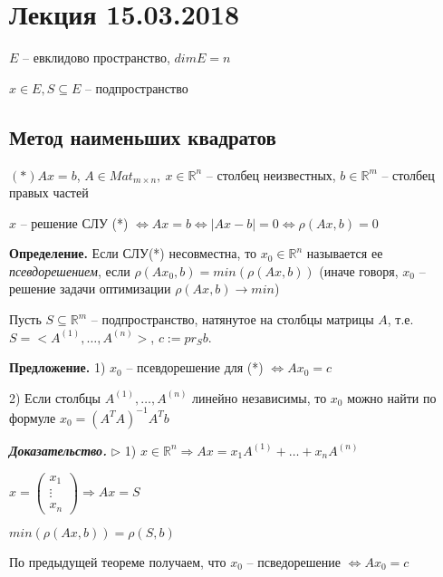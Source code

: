 \section{Лекция 15.03.2018}

$E$ -- евклидово пространство, $dimE = n$

$x \in E, S \subseteq E$ -- подпространство

\vspace{\baselineskip}
\subsection{Метод наименьших квадратов}

$(*) Ax = b$, $A \in Mat_{m \times n}, \ x \in \mathbb{R}^n$ -- столбец неизвестных, $b \in \mathbb{R}^m$ -- столбец правых частей

$x$ -- решение СЛУ (*) $\Leftrightarrow Ax = b \Leftrightarrow |Ax - b| = 0 \Leftrightarrow \rho (Ax, b) = 0$

\vspace{\baselineskip}
\textbf{Определение.} Если СЛУ(*) несовместна, то $x_0 \in \mathbb{R}^n$ называется ее \textit{псевдорешением}, если $\rho(Ax_0, b) = min (\rho(Ax, b))$ (иначе говоря, $x_0$ -- решение задачи оптимизации $\rho(Ax, b) \rightarrow min$)

\vspace{\baselineskip}
Пусть $S \subseteq \mathbb{R}^m$ -- подпространство, натянутое на столбцы матрицы $A$, т.е. $S = <A^{(1)}, \dots, A^{(n)}>$, $c := pr_S b$.

\vspace{\baselineskip}
\textbf{Предложение.} 1) $x_0$ -- псевдорешение для (*) $\Leftrightarrow Ax_0 = c$

2) Если столбцы $A^{(1)}, \dots, A^{(n)}$ линейно независимы, то $x_0$ можно найти по формуле $x_0 = (A^T A)^{-1} A^T b$

\vspace{\baselineskip}
\textbf{\textit{Доказательство.}} $\rhd$ 1) $x \in \mathbb{R}^n \Rightarrow Ax = x_1 A^{(1)} + \dots + x_n A^{(n)}$

$x = \begin{pmatrix} x_1 \\ \vdots \\ x_n \end{pmatrix} \Rightarrow Ax = S$

$min( \rho (Ax, b)) = \rho (S, b)$

\vspace{\baselineskip}
По предыдущей теореме получаем, что $x_0$ -- псведорешение $\Leftrightarrow Ax_0 = c$

